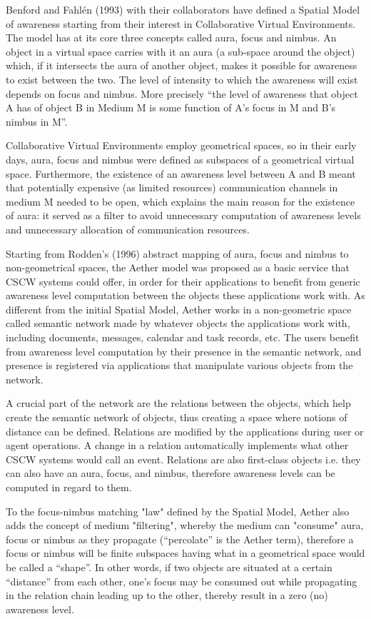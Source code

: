 \documentclass{ecscw2007}
\begin{document}
Benford and Fahl\'{e}n (1993) with their collaborators have defined a Spatial Model of awareness starting from their interest in Collaborative Virtual Environments. The model has at its core three concepts called aura, focus and nimbus. An object in a virtual space carries with it an aura (a sub-space around the object) which, if it intersects the aura of another object, makes it possible for awareness to exist between the two. The level of intensity to which the awareness will exist depends on focus and nimbus. More precisely ``the level of awareness that object A has of object B in Medium M is some function of A's focus in M and B's nimbus in M''.

Collaborative Virtual Environments employ geometrical spaces, so in their early days, aura, focus and nimbus were defined as subspaces of a geometrical virtual space. Furthermore, the existence of an awareness level between A and B meant that potentially expensive (as limited resources) communication channels in medium M needed to be open, which explains the main reason for the existence of aura: it served as a filter to avoid unnecessary computation of awareness levels and unnecessary allocation of communication resources. 

Starting from Rodden's (1996) abstract mapping of aura, focus and nimbus to non-geometrical spaces, the Aether model was proposed as a basic service that CSCW systems could offer, in order for their applications to benefit from generic awareness level computation between the objects these applications work with. As different from the initial Spatial Model, Aether works in a non-geometric space called semantic network made by whatever objects the applications work with, including documents, messages, calendar and task records, etc. The users benefit from awareness level computation by their presence in the semantic network, and presence is registered via applications that manipulate various objects from the network. 

A crucial part of the network are the relations between the objects, which help create the semantic network of objects, thus creating a space where notions of distance can be defined.  Relations are modified by the applications during user or agent operations. A change in a relation automatically implements what other CSCW systems would call an event. Relations are also first-class objects i.e. they can also have an aura, focus, and nimbus, therefore awareness levels can be computed in regard to them. 

To the focus-nimbus matching "law" defined by the Spatial Model, Aether also adds the concept of medium "filtering", whereby the medium can "consume" aura, focus or nimbus as they propagate (``percolate'' is the Aether term), therefore a focus or nimbus will be finite subspaces having what in a geometrical space would be called a ``shape''. In other words, if two objects are situated at a certain ``distance'' from each other, one's focus may be consumed out while propagating in the relation chain leading up to the other, thereby result in a zero (no) awareness level.
\end{document}
